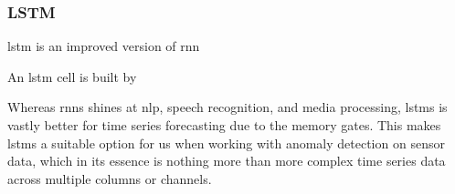 \subsubsection{LSTM}

\acrfull{lstm} is an improved version of \acrshort{rnn}

An \acrshort{lstm} cell is built by 


Whereas \acrshort{rnn}s shines at \acrshort{nlp}, speech recognition, and media processing, \acrshort{lstm}s is vastly better for time series forecasting due to the memory gates. This makes \acrshort{lstm}s a suitable option for us when working with anomaly detection on sensor data, which in its essence is nothing more than more complex time series data across multiple columns or channels. 

